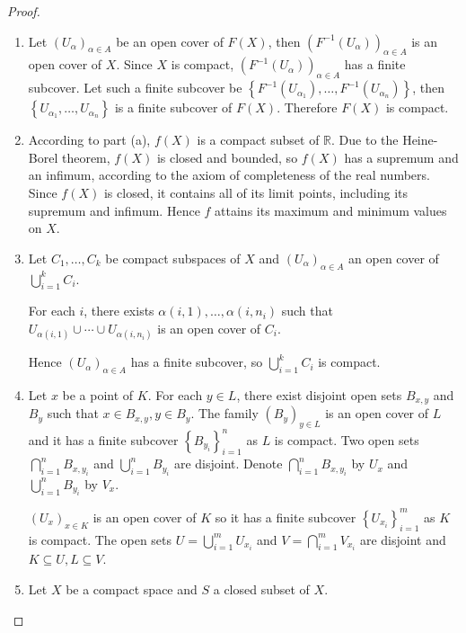 \begin{proof}
    \begin{enumerate}[itemsep=0pt,label={(\alph*)}]
        \item Let \( {(U_{\alpha})}_{\alpha\in A} \) be an open cover of \( F(X) \), then \( {(F^{-1}(U_{\alpha}))}_{\alpha\in A} \) is an open cover of \( X \). Since \( X \) is compact, \( {(F^{-1}(U_{\alpha}))}_{\alpha\in A} \) has a finite subcover. Let such a finite subcover be \( \left\{ F^{-1}(U_{\alpha_{1}}), \ldots, F^{-1}(U_{\alpha_{n}}) \right\} \), then \( \left\{ U_{\alpha_{1}}, \ldots, U_{\alpha_{n}} \right\} \) is a finite subcover of \( F(X) \). Therefore \( F(X) \) is compact.
        \item According to part (a), \( f(X) \) is a compact subset of \( \mathbb{R} \). Due to the Heine-Borel theorem, \( f(X) \) is closed and bounded, so \( f(X) \) has a supremum and an infimum, according to the axiom of completeness of the real numbers. Since \( f(X) \) is closed, it contains all of its limit points, including its supremum and infimum. Hence \( f \) attains its maximum and minimum values on \( X \).
        \item Let \( C_{1}, \ldots, C_{k} \) be compact subspaces of \( X \) and \( {(U_{\alpha})}_{\alpha \in A} \) an open cover of \( \bigcup_{i=1}^{k} C_{i} \).

              For each \( i \), there exists \( \alpha(i,1), \ldots, \alpha(i, n_{i}) \) such that \( U_{\alpha(i,1)} \cup \cdots \cup U_{\alpha(i,n_{i})} \) is an open cover of \( C_{i} \).

              Hence \( {(U_{\alpha})}_{\alpha \in A} \) has a finite subcover, so \( \bigcup_{i=1}^{k} C_{i} \) is compact.
        \item Let \( x \) be a point of \( K \). For each \( y \in L \), there exist disjoint open sets \( B_{x,y} \) and \( B_{y} \) such that \( x \in B_{x,y}, y \in B_{y} \). The family \( {(B_{y})}_{y \in L} \) is an open cover of \( L \) and it has a finite subcover \( {\left\{ B_{y_{i}} \right\}}_{i=1}^{n} \) as \( L \) is compact. Two open sets \( \bigcap_{i=1}^{n} B_{x,y_{i}} \) and \( \bigcup_{i=1}^{n} B_{y_{i}} \) are disjoint. Denote \( \bigcap_{i=1}^{n} B_{x,y_{i}} \) by \( U_{x} \) and \( \bigcup_{i=1}^{n} B_{y_{i}} \) by \( V_{x} \).

              \( {(U_{x})}_{x\in K} \) is an open cover of \( K \) so it has a finite subcover \( {\left\{ U_{x_{i}} \right\}}_{i=1}^{m} \) as \( K \) is compact. The open sets \( U = \bigcup_{i=1}^{m} U_{x_{i}} \) and \( V = \bigcap_{i=1}^{m} V_{x_{i}} \) are disjoint and \( K \subseteq U, L \subseteq V \).
        \item Let \( X \) be a compact space and \( S \) a closed subset of \( X \).


\end{enumerate}
\end{proof}

